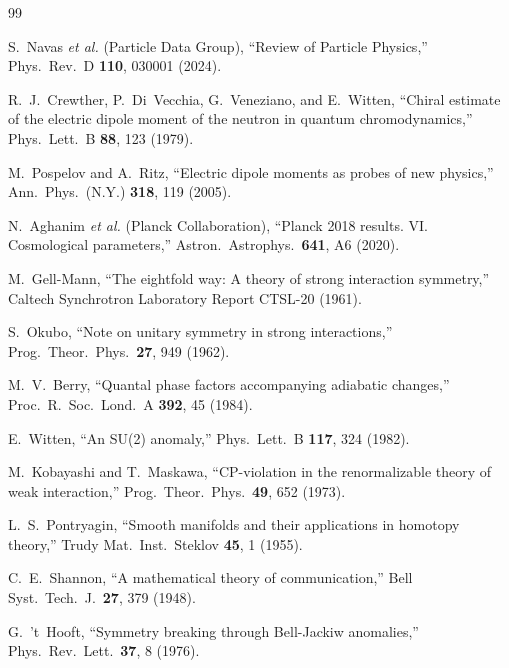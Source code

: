 \documentclass[11pt,a4paper,twoside]{book}
\theoremstyle{definition}
\begin{document}
\begin{thebibliography}{99}

S.~Navas \emph{et al.} (Particle Data Group),
``Review of Particle Physics,''
Phys.\ Rev.\ D \textbf{110}, 030001 (2024).

R.~J.~Crewther, P.~Di~Vecchia, G.~Veneziano, and E.~Witten,
``Chiral estimate of the electric dipole moment of the neutron in
quantum chromodynamics,''
Phys.\ Lett.\ B \textbf{88}, 123 (1979).

M.~Pospelov and A.~Ritz,
``Electric dipole moments as probes of new physics,''
Ann.\ Phys.\ (N.Y.) \textbf{318}, 119 (2005).

N.~Aghanim \emph{et al.} (Planck Collaboration),
``Planck 2018 results. VI. Cosmological parameters,''
Astron.\ Astrophys.\ \textbf{641}, A6 (2020).

M.~Gell-Mann,
``The eightfold way: A theory of strong interaction symmetry,''
Caltech Synchrotron Laboratory Report CTSL-20 (1961).

S.~Okubo,
``Note on unitary symmetry in strong interactions,''
Prog.\ Theor.\ Phys.\ \textbf{27}, 949 (1962).

M.~V.~Berry,
``Quantal phase factors accompanying adiabatic changes,''
Proc.\ R.\ Soc.\ Lond.\ A \textbf{392}, 45 (1984).

E.~Witten,
``An SU(2) anomaly,''
Phys.\ Lett.\ B \textbf{117}, 324 (1982).

M.~Kobayashi and T.~Maskawa,
``CP-violation in the renormalizable theory of weak interaction,''
Prog.\ Theor.\ Phys.\ \textbf{49}, 652 (1973).

L.~S.~Pontryagin,
``Smooth manifolds and their applications in homotopy theory,''
Trudy Mat.\ Inst.\ Steklov \textbf{45}, 1 (1955).

C.~E.~Shannon,
``A mathematical theory of communication,''
Bell Syst.\ Tech.\ J.\ \textbf{27}, 379 (1948).

G.~'t~Hooft,
``Symmetry breaking through Bell-Jackiw anomalies,''
Phys.\ Rev.\ Lett.\ \textbf{37}, 8 (1976).

\end{thebibliography}

\backmatter
\printindex
\end{document}
